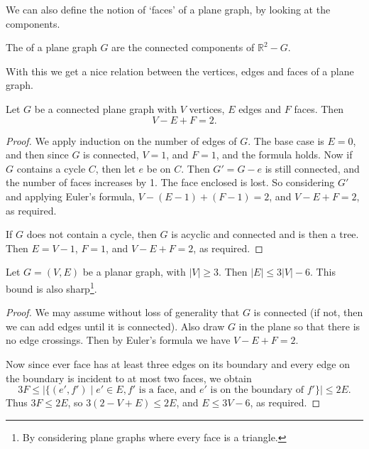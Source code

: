 \documentclass[a4paper]{scrartcl}
\begin{document}
We can also define the notion of `faces' of a plane graph, by looking at the components.

\begin{definition}[Faces]
	The  of a plane graph $G$ are the connected components of $\mathbb{R}^2 - G$.
\end{definition}

With this we get a nice relation between the vertices, edges and faces of a plane graph.

\begin{theorem}
	Let $G$ be a connected plane graph with $V$ vertices, $E$ edges and $F$ faces. Then
	$$
	V - E + F = 2.
	$$
\end{theorem}
\begin{proof}
	We apply induction on the number of edges of $G$. The base case is $E = 0$, and then since $G$ is connected, $V = 1$, and $F = 1$, and the formula holds. 
	Now if $G$ contains a cycle $C$, then let $e$ be on $C$. Then $G' = G - e$ is still connected, and the number of faces increases by 1. The face enclosed is lost. So considering $G'$ and applying Euler's formula, $V - (E - 1) + (F - 1) = 2$, and $V - E + F = 2$, 
	as required.

	If $G$ does not contain a cycle, then $G$ is acyclic and connected and is then a tree. Then $E = V - 1$, $F = 1$, and $V - E + F = 2$, as required.
\end{proof}

\begin{corollary}
	Let $G = (V, E)$ be a planar graph, with $|V| \geq 3$. Then $|E| \leq 3|V| - 6$. This bound is also sharp\footnote{By considering plane graphs where every face is a triangle.}.
\end{corollary}
\begin{proof}
	We may assume without loss of generality that $G$ is connected (if not, then we can add edges until it is connected). Also draw $G$ in the plane so that there is no edge crossings. Then by Euler's formula we have $V - E + F = 2$.

	Now since ever face has at least three edges on its boundary and every edge on the boundary is incident to at most two faces, we obtain
	$$
	3F \leq \left|\{(e', f') \mid e' \in E, f' \text{ is a face, and } e' \text{ is on the boundary of }f'\}\right| \leq 2E.
	$$
	Thus $3F \leq 2E$, so $3(2 - V + E) \leq 2E$, and $E \leq 3V - 6$, as required.
\end{proof}
\end{document}
